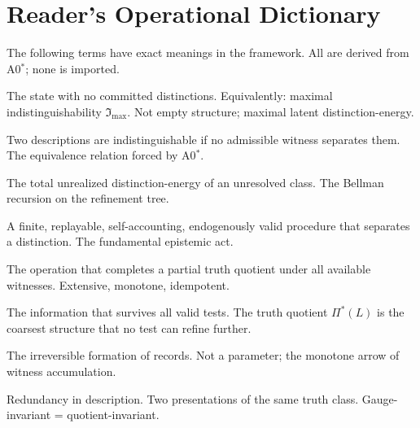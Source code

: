 
\section{Reader's Operational Dictionary}
\label{app:dictionary}

The following terms have exact meanings in the framework.  All are derived
from A0$^*$; none is imported.

\begin{description}[nosep, leftmargin=2em]

\item[Nothingness ($\noth$).]
  The state with no committed distinctions.  Equivalently: maximal
  indistinguishability $\mathfrak{I}_{\max}$.  Not empty structure;
  maximal latent distinction-energy.

\item[Indistinguishability.]
  Two descriptions are indistinguishable if no admissible witness
  separates them.  The equivalence relation forced by A0$^*$.

\item[Latent energy ($\mathcal{U}_{\mathrm{ind}}$).]
  The total unrealized distinction-energy of an unresolved class.
  The Bellman recursion on the refinement tree.

\item[Witness.]
  A finite, replayable, self-accounting, endogenously valid procedure
  that separates a distinction.  The fundamental epistemic act.

\item[Closure ($\Pi$).]
  The operation that completes a partial truth quotient under all
  available witnesses.  Extensive, monotone, idempotent.

\item[Truth.]
  The information that survives all valid tests.  The truth quotient
  $\Pi^*(L)$ is the coarsest structure that no test can refine further.

\item[Time.]
  The irreversible formation of records.  Not a parameter; the
  monotone arrow of witness accumulation.

\item[Gauge.]
  Redundancy in description.  Two presentations of the same truth class.
  Gauge-invariant = quotient-invariant.


\end{description}
